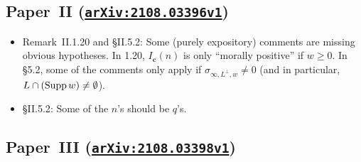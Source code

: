 \documentclass[12pt]{article}
\begin{document}
\subsection{Paper~II (\href{https://arxiv.org/abs/2108.03396v1}{\texttt{arXiv:2108.03396v1}})}

\begin{itemize}
    \item Remark~II.1.20 and \S{II.5.2}:
    Some (purely expository) comments are missing obvious hypotheses.
    In 1.20, $I_{\bm{c}}(n)$ is only ``morally positive'' if $w\geq 0$.
    In \S5.2, some of the comments only apply if $\sigma_{\infty,L^\perp,w}\neq 0$ (and in particular, $L\cap (\operatorname{Supp}{w})\neq \emptyset$).
    
    \item \S{II.5.2}:
    Some of the $n$'s should be $q$'s.
\end{itemize}

\subsection{Paper~III (\href{https://arxiv.org/abs/2108.03398v1}{\texttt{arXiv:2108.03398v1}})}
\end{document}
